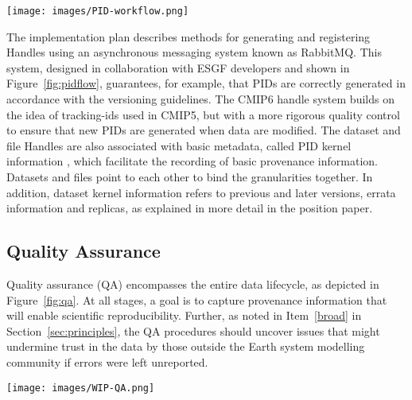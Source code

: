 \documentclass[gmd,manuscript]{copernicus}
\begin{document}
\begin{figure*}
  \begin{center}
    \texttt{[image: images/PID-workflow.png]}
  \end{center}
  \caption{PID workflow, showing the generation and registry of PIDs,
    with checkpoints where compliance is assured.}
  \label{fig:pidflow}
\end{figure*}

The implementation plan describes methods for generating and
registering Handles using an asynchronous messaging system known as
RabbitMQ. This system, designed in collaboration with ESGF developers
and shown in Figure~\ref{fig:pidflow}, guarantees, for example, that
PIDs are correctly generated in accordance with the versioning
guidelines. The CMIP6 handle system builds on the idea of tracking-ids
used in CMIP5, but with a more rigorous quality control to ensure that
new PIDs are generated when data are modified. The dataset and file
Handles are also associated with basic metadata, called PID kernel
information \citep{ref:zhouetal2018}, which facilitate the recording
of basic provenance information. Datasets and files point to each
other to bind the granularities together. In addition, dataset kernel
information refers to previous and later versions, errata information
and replicas, as explained in more detail in the position paper.

\subsection{Quality Assurance}
\label{sec:qa}

Quality assurance (QA) encompasses the entire data lifecycle, as
depicted in Figure~\ref{fig:qa}. At all stages, a goal is to capture
provenance information that will enable scientific reproducibility.
Further, as noted in Item~\ref{broad} in Section~\ref{sec:principles},
the QA procedures should uncover issues that might undermine trust in
the data by those outside the Earth system modelling community if
errors were left unreported.

\begin{figure*}
  \begin{center}
    \texttt{[image: images/WIP-QA.png]}
  \end{center}
  \caption{Schematic of the phases of quality assurance, with earlier
    stages in the hands of modelling centres (left), and more formal
    long-term data curation stages at right. Quality assurance is
    applied both to the data (D, above) as well as the metadata (M)
    describing the data. Figure drawn from the WIP's Quality Assurance
    position paper.}
  \label{fig:qa}
\end{figure*}
\end{document}
